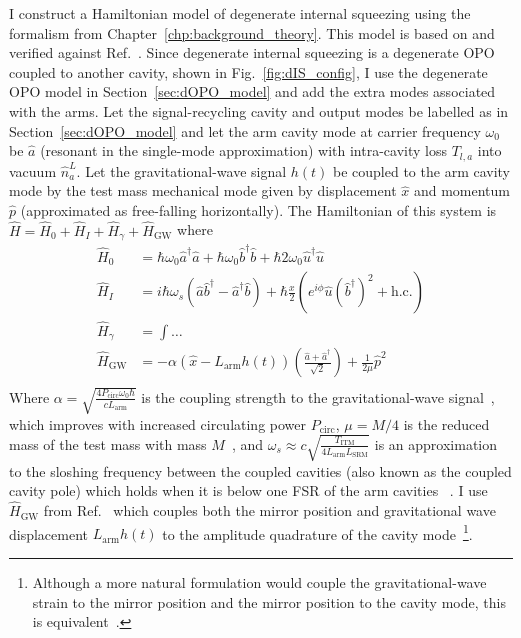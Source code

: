 I construct a Hamiltonian model of degenerate internal squeezing using the formalism from Chapter~\ref{chp:background_theory}. This model is based on and verified against Ref.~\cite{Korobko2019}. %
Since degenerate internal squeezing is a degenerate OPO coupled to another cavity, shown in Fig.~\ref{fig:dIS_config}, I use the degenerate OPO model in Section~\ref{sec:dOPO_model} and add the extra modes associated with the arms. Let the signal-recycling cavity and output modes be labelled as in Section~\ref{sec:dOPO_model} and let the arm cavity mode at carrier frequency $\omega_0$ be $\hat a$ (resonant in the single-mode approximation) with intra-cavity loss $T_{l,a}$ into vacuum $\hat n^L_a$. Let the gravitational-wave signal $h(t)$ be coupled to the arm cavity mode by the test mass mechanical mode given by displacement $\hat x$ and momentum $\hat p$ (approximated as free-falling horizontally). 
The Hamiltonian of this system is $\hat H = \hat H_0 + \hat H_I + \hat H_\gamma + \hat H_\text{GW}$ where~\cite{}
\begin{align}
\hat H_0 &= \hbar \omega_0 \hat a^\dag \hat a + \hbar \omega_0 \hat b^\dag \hat b + \hbar 2\omega_0 \hat u^\dag \hat u\\
\hat H_I &= i\hbar\omega_s(\hat a\hat b^\dag-\hat a^\dag\hat b) +\hbar \frac{x}{2} (e^{i\phi} \hat u (\hat b^\dag)^2 + \text{h.c.})\\
\hat H_\gamma &= \int \ldots \\
\hat H_\text{GW} &= -\alpha (\hat{x}-L_\mathrm{arm}h(t))(\frac{\hat{a}+\hat{a}^\dag}{\sqrt{2}})+\frac{1}{2\mu}\hat{p}^2 \\
\end{align}
Where $\alpha=\sqrt{\frac{4 P_\text{circ} \omega_0 \hbar}{c  L_\text{arm}}}$  is the coupling strength to the gravitational-wave signal~\cite{}, which improves with increased circulating power $P_\text{circ}$, $\mu=M/4$ is the reduced mass of the test mass with mass $M$~\cite{}, and $\omega_s\approx c\sqrt{\frac{T_\text{ITM}}{4 L_\text{arm} L_\text{SRM}}}$ is an approximation to the sloshing frequency between the coupled cavities (also known as the coupled cavity pole) which holds when it is below one FSR of the arm cavities ~\cite{}. I use $\hat H_\text{GW}$ from Ref.~\cite{Li2020,original source?} which  couples both the mirror position and gravitational wave displacement $L_\text{arm} h(t)$ to the amplitude quadrature of the cavity mode~\footnote{Although a more natural formulation would couple the gravitational-wave strain to the mirror position and the mirror position to the cavity mode, this is equivalent~\cite{}.}. 
